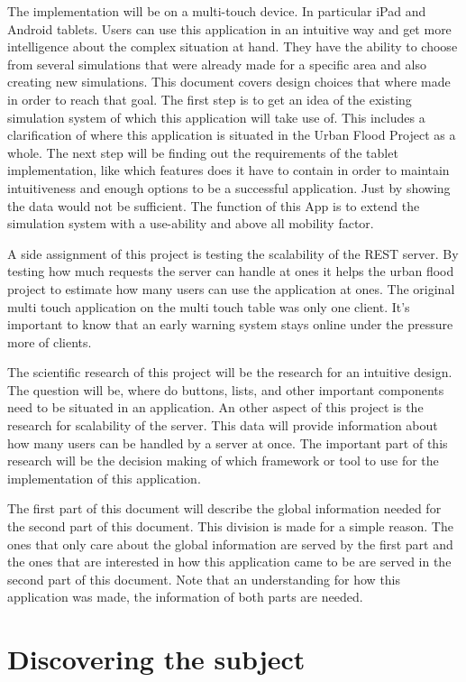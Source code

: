 The implementation will be on a multi-touch device. In particular iPad and Android tablets. Users can use this application in an intuitive way and get more intelligence about the complex situation at hand. They have the ability to choose from several simulations that were already made for a specific area and also creating new simulations.
This document covers design choices that where made in order to reach that goal. The first step is to get an idea of the existing simulation system of which this application will take use of. This includes a clarification of where this application is situated in the Urban Flood Project as a whole. The next step will be finding out the requirements of the tablet implementation, like which features does it have to contain in order to maintain intuitiveness and enough options to be a successful application. Just by showing the data would not be sufficient. The function of this App is to extend the simulation system with a use-ability and above all mobility factor.

A side assignment of this project is testing the scalability of the REST server. By testing how much requests the server can handle at ones it helps the urban flood project to estimate how many users can use the application at ones. The original multi touch application on the multi touch table was only one client. It's important to know that an early warning system stays online under the pressure more of clients.

The scientific research of this project will be the research for an intuitive design. The question will be, where do buttons, lists, and other important components need to be situated in an application. An other aspect of this project is the research for scalability of the server. This data will provide information about how many users can be handled by a server at once. The important part of this research will be the decision making of which framework or tool to use for the implementation of this application.

The first part of this document will describe the global information needed for the second part of this document. This division is made for  a simple reason. The ones that only care about the global information are served by the first part and the ones that are interested in how this application came to be are served in the second part of this document. Note that an understanding for how this application was made, the information of both parts are needed.

\part{Discovering the subject}
